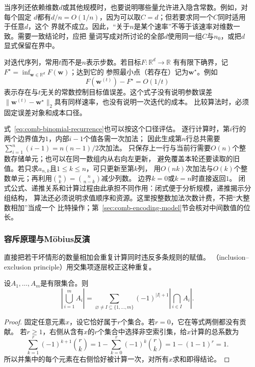 当序列还依赖维数$d$或其他规模时，也要说明哪些量允许进入隐含常数。例如，对每个固定
$d$都有$d/n=O(1/n)$，因为可以取$C=d$；但若要求同一个$C$同时适用于任意$d$，这个
界就不成立。因此，“关于$n$是某个速率”不等于该速率对维数一致。需要一致结论时，应把
量词写成对所讨论的全部$d$使用同一组$C$与$n_0$，或把$d$显式保留在界中。

对迭代序列，常用$t$而不是$n$表示步数。若目标$F:\mathbb{R}^d\to\mathbb{R}$
有有限下确界，记$F^\star=\inf_{\bm{w}\in\mathbb{R}^d}F(\bm{w})$；达到它的
参照最小点（若存在）记为$\bm{w}^\star$。例如
\[
  F(\bm{w}^{(t)})-F^\star=O(1/t)
\]
表示存在与$t$无关的常数控制目标值误差。这个式子没有说明参数误差
$\lVert\bm{w}^{(t)}-\bm{w}^\star\rVert_2$具有同样速率，也没有说明一次迭代的成本。
比较算法时，必须固定误差对象和成本口径。

式~\eqref{eq:comb-binomial-recurrence}也可以按这个口径评估。
逐行计算时，第$i$行的两个边界值为$1$，内部$i-1$个值各需一次加法；
因此生成第$n$行总共需要$\sum_{i=1}^n(i-1)=n(n-1)/2$次加法。
只保存上一行与当前行需要$O(n)$个整数存储单元；也可以在同一数组内从右向左更新，
避免覆盖本轮还要读取的旧值。若只求$a_{n,k}$且$1\leq k\leq n$，可只更新至第$k$列，
用$O(nk)$次加法与$O(k)$个整数单元；再利用$\binom nk=\binom n{n-k}$减少列数。
边界$k=0$或$k=n$时直接返回$1$。
闭式公式、递推关系和计算过程由此承担不同作用：闭式便于分析规模，递推揭示分组结构，
算法还必须说明求值顺序和资源。这里按整数加法次数计费，不把“大整数相加”当成一个
比特操作；第~\ref{sec:comb-encoding-model}节会核对中间数值的位长。

\subsubsection{容斥原理与Möbius反演}
\label{sec:comb-inclusion-mobius}

直接把若干坏情形的数量相加会重复计算同时违反多条规则的赋值。
（inclusion--exclusion principle）用交集项逐层校正这种重复。

\begin{theorem}[有限容斥原理]
\label{thm:comb-inclusion-exclusion}
设$A_1,\ldots,A_m$是有限集合。则
\begin{equation}
  \left|\bigcup_{i=1}^{m}A_i\right|
  =
  \sum_{\varnothing\neq I\subseteq\{1,\ldots,m\}}
  (-1)^{|I|+1}
  \left|\bigcap_{i\in I}A_i\right|.
  \label{eq:comb-inclusion-exclusion}
\end{equation}
\end{theorem}

\begin{proof}
固定任意元素$x$，设它恰好属于$r$个集合。若$r=0$，它在等式两侧都没有贡献。
若$r\geq1$，右侧从含有$x$的$r$个集合中选择非空索引集，给$x$计算的总系数为
\[
  \sum_{k=1}^{r}(-1)^{k+1}\binom{r}{k}
  =
  1-\sum_{k=0}^{r}(-1)^k\binom{r}{k}
  =1-(1-1)^r=1.
\]
所以并集中的每个元素在右侧恰好被计算一次，对所有$x$求和即得结论。
\end{proof}


